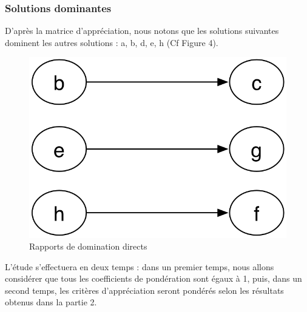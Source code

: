 \documentclass[a4paper, 11pt]{article}
\begin{document}
\subsubsection{Solutions dominantes}
D’après la matrice d'appréciation, nous notons que les solutions suivantes dominent les autres solutions : a, b, d, e, h (Cf Figure 4).\\

\begin{figure}[H]
   \begin{center}
        \includegraphics[scale=0.30]{../CR/src/Mimi/3eme.png}
        \caption{
           \label{fig} Rapports de domination directs
        }
    \end{center}
\end{figure}
L’étude s'effectuera en deux temps : dans un premier temps, nous allons considérer que tous les coefficients de pondération sont égaux à 1, puis, dans un second temps, les critères d’appréciation seront pondérés selon les résultats obtenus dans la partie 2.
\end{document}
